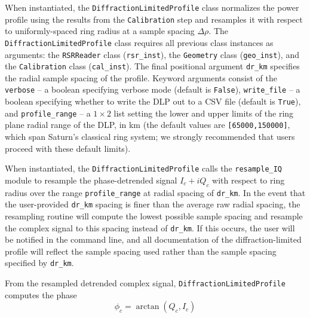\documentclass[titlepage, 12pt]{article}
\begin{document}
            When instantiated, the \texttt{DiffractionLimitedProfile} class
            normalizes the power profile using the results from the
            \texttt{Calibration} step and resamples it with respect to
            uniformly-spaced ring radius at a sample spacing $\Delta\rho$. The
            \texttt{DiffractionLimitedProfile} class requires all previous class
            instances as arguments: the \texttt{RSRReader} class
            (\texttt{rsr\_inst}), the \texttt{Geometry} class
            (\texttt{geo\_inst}), and the \texttt{Calibration} class
            (\texttt{cal\_inst}). The final positional argument \texttt{dr\_km}
            specifies the radial sample spacing of the profile. Keyword arguments
            consist of the \texttt{verbose} -- a boolean specifying verbose mode
            (default is \texttt{False}), \texttt{write\_file} -- a boolean
            specifying whether to write the DLP out to a CSV file (default is
            \texttt{True}), and \texttt{profile\_range} -- a $1\times 2$ list
            setting the lower and upper limits of the ring plane radial range of the DLP, in km (the default values are
            \texttt{[65000,150000]}, which span Saturn's classical ring system; we strongly recommended that users proceed with
            these default limits).
            \par\hfill\par
            When instantiated, the \texttt{DiffractionLimitedProfile} calls the
            \texttt{resample\_IQ} module to resample the phase-detrended signal
            $I_c+iQ_c$ with respect to ring radius over the range
            \texttt{profile\_range} at radial spacing of \texttt{dr\_km}. In the event that the user-provided \texttt{dr\_km} spacing is finer than the average raw radial spacing, the resampling routine will compute the lowest possible sample spacing and resample the complex signal to this spacing instead of \texttt{dr\_km}. If this occurs, the user will be notified in the command line, and all documentation of the diffraction-limited profile will reflect the sample spacing used rather than the sample spacing specified by \texttt{dr\_km}.
            \par\hfill\par
            From the resampled detrended complex signal,
            \texttt{DiffractionLimitedProfile} computes the phase
            \begin{equation}
                \phi_{c}=\arctan(Q_c,I_c)
            \end{equation}
\end{document}
